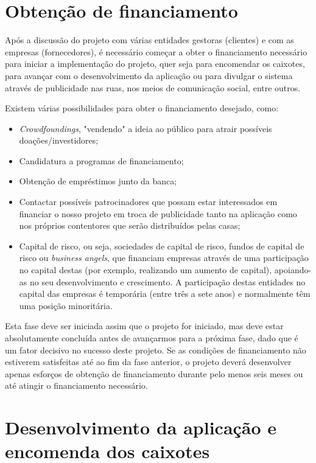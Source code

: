 \documentclass[11pt, a4paper, oneside]{book}
\begin{document}
\section{Obtenção de financiamento}

Após a discussão do projeto com várias entidades gestoras (clientes) e com as empresas (fornecedores), é necessário começar a obter o financiamento necessário para iniciar a implementação do projeto, quer seja para encomendar os caixotes, para avançar com o desenvolvimento da aplicação ou para divulgar o sistema através de publicidade nas ruas, nos meios de comunicação social, entre outros.

Existem várias possibilidades para obter o financiamento desejado, como:

\begin{itemize}
    \itemsep0em
    \item \textit{Crowdfoundings}, "vendendo"{} a ideia ao público para atrair possíveis doações/investidores;
    \item Candidatura a programas de financiamento;
    \item Obtenção de empréstimos junto da banca;
    \item Contactar possíveis patrocinadores que possam estar interessados em financiar o nosso projeto em troca de publicidade tanto na aplicação como nos próprios contentores que serão distribuídos pelas casas;
    \item Capital de risco, ou seja, sociedades de capital de risco, fundos de capital de risco ou \textit{business angels}, que financiam empresas através de uma participação no capital destas (por exemplo, realizando um aumento de capital), apoiando-as no seu desenvolvimento e crescimento. A participação destas entidades no capital das empresas é temporária (entre três a sete anos) e normalmente têm uma posição minoritária.
\end{itemize}

Esta fase deve ser iniciada assim que o projeto for iniciado, mas deve estar absolutamente concluída antes de avançarmos para a próxima fase, dado que é um fator decisivo no sucesso deste projeto. Se as condições de financiamento não estiverem satisfeitas até ao fim da fase anterior, o projeto deverá desenvolver apenas esforços de obtenção de financiamento durante pelo menos seis meses ou até atingir o financiamento necessário.

\section{Desenvolvimento da aplicação e encomenda dos caixotes}
\end{document}
